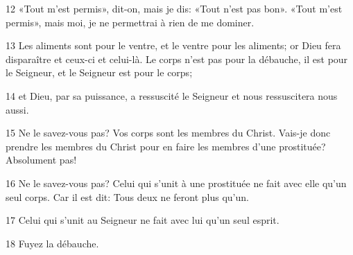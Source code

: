 
12 «Tout m’est permis», dit-on, mais je dis: «Tout n'est pas bon». «Tout m’est permis», mais moi, je ne permettrai à rien de me dominer.

13 Les aliments sont pour le ventre, et le ventre pour les aliments; or Dieu fera disparaître et ceux-ci et celui-là. Le corps n’est pas pour la débauche, il est pour le Seigneur, et le Seigneur est pour le corps;

14 et Dieu, par sa puissance, a ressuscité le Seigneur et nous ressuscitera nous aussi.

15 Ne le savez-vous pas? Vos corps sont les membres du Christ. Vais-je donc prendre les membres du Christ pour en faire les membres d’une prostituée? Absolument pas!

16 Ne le savez-vous pas? Celui qui s’unit à une prostituée ne fait avec elle qu’un seul corps. Car il est dit: Tous deux ne feront plus qu’un.

17 Celui qui s’unit au Seigneur ne fait avec lui qu’un seul esprit.

18 Fuyez la débauche.